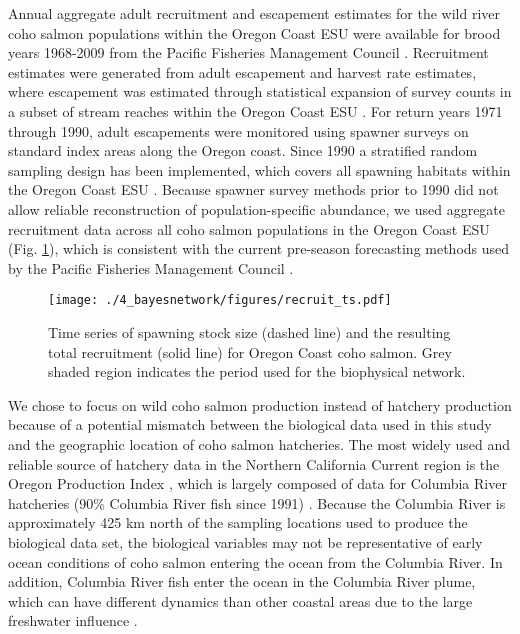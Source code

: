 Annual aggregate adult recruitment and escapement estimates for the wild river
coho salmon populations within the Oregon Coast ESU were available for brood
years 1968-2009 from the Pacific Fisheries Management Council \citep{PFMC2013,
Rupp2012}. Recruitment estimates were generated from adult escapement and
harvest rate estimates, where escapement was estimated through statistical
expansion of survey counts in a subset of stream reaches within the Oregon Coast
ESU \citep{Lewis2010}. For return years 1971 through 1990, adult escapements
were monitored using spawner surveys on standard index areas along the Oregon
coast. Since 1990 a stratified random sampling design has been implemented,
which covers all spawning habitats within the Oregon Coast ESU
\citep{Jacobs1998, Lewis2010}. Because spawner survey methods prior to 1990 did
not allow reliable reconstruction of population-specific abundance, we used
aggregate recruitment data across all coho salmon populations in the Oregon
Coast ESU (Fig. \ref{fig:bn:3}), which is consistent with the current pre-season
forecasting methods used by the Pacific Fisheries Management Council
\citep{PFMC2013}.

\begin{figure}[htbp]
  \centering \texttt{[image: ./4\_bayesnetwork/figures/recruit\_ts.pdf]}
  \caption[Time series of spawning stock size and the resulting
           total recruitment]{Time series of spawning stock size (dashed line)
           and the resulting total recruitment (solid line) for Oregon Coast
           coho salmon. Grey shaded region indicates the period used for the
           biophysical network.}
  \label{fig:bn:3}
\end{figure}

We chose to focus on wild coho salmon production instead of hatchery production
because of a potential mismatch between the biological data used in this study
and the geographic location of coho salmon hatcheries. The most widely used and
reliable source of hatchery data in the Northern California Current region is
the Oregon Production Index \citep{Logerwell2003a, Koslow2002a, Cole2000a},
which is largely composed of data for Columbia River hatcheries (90\% Columbia
River fish since 1991) \citep{PFMC2013}. Because the Columbia River is
approximately 425 km north of the sampling locations used to produce the
biological data set, the biological variables may not be representative of early
ocean conditions of coho salmon entering the ocean from the Columbia River. In
addition, Columbia River fish enter the ocean in the Columbia River plume, which
can have different dynamics than other coastal areas due to the large freshwater
influence \citep{Hickey1998}.

